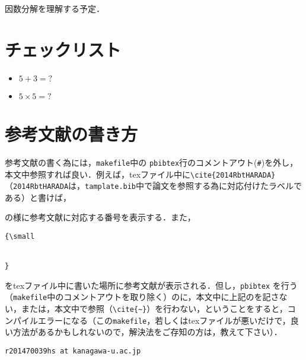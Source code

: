 \documentclass[10pt,twocolumn]{jarticle}
\begin{document}
因数分解を理解する予定．

\par

{\small
 
 
}

\section{チェックリスト}
\begin{itemize}
\item $5 + 3 = ?$
\item $5 \times 5 = ?$
\end{itemize}

\appendix
\section{参考文献の書き方}

参考文献の書く為には，\verb|makefile|中の \verb|pbibtex|行のコメントアウト(\verb|#|)を外し，本文中参照すれば良い．例えば，texファイル中に\verb|\cite{2014RbtHARADA}|（\verb|2014RbtHARADA|は，\verb|tamplate.bib|中で論文\cite{2014RbtHARADA}を参照する為に対応付けたラベルである）と書けば，\par
{\centering

\cite{2014RbtHARADA}

}
\noindent の様に参考文献に対応する番号を表示する．また，

\begin{verbatim}
{\small


}
\end{verbatim}
をtexファイル中に書いた場所に参考文献が表示される．但し，\verb|pbibtex| を行う（\verb|makefile|中のコメントアウトを取り除く）のに，本文中に上記の\verb||を記さない，または，本文中で参照（\verb|\cite{~}|）を行わない，ということをすると，コンパイルエラーになる（この\verb|makefile|，若しくはtexファイルが悪いだけで，良い方法があるかもしれないので，解決法をご存知の方は，教えて下さい）．\par
\noindent \verb|r201470039hs at kanagawa-u.ac.jp|
\end{document}
